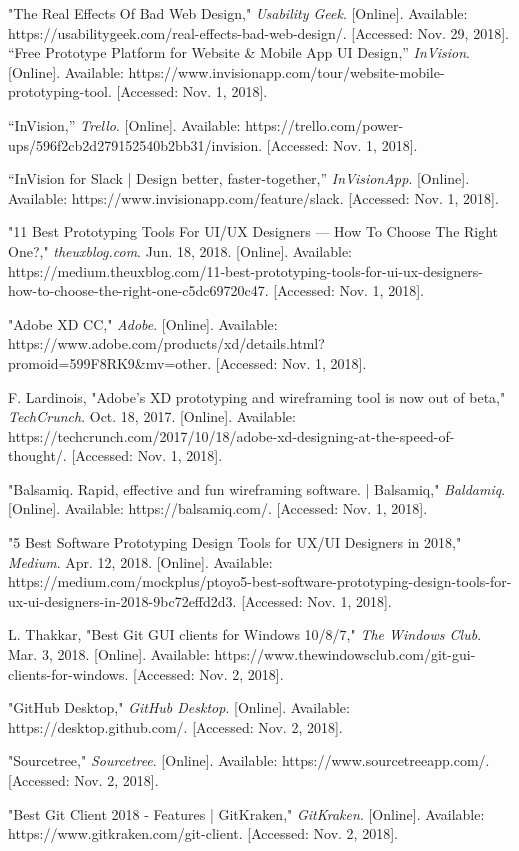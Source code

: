 \documentclass[10pt, letterpaper,draftclsnofoot,onecolumn, compsoc]{IEEEtran}
\begin{document}
\begin{thebibliography}{19}
"The Real Effects Of Bad Web Design,"
\textit{Usability Geek}.
[Online]. Available: https://usabilitygeek.com/real-effects-bad-web-design/. [Accessed: Nov. 29, 2018].
“Free Prototype Platform for Website \& Mobile App UI Design,” 
\textit{InVision}. 
[Online]. Available: https://www.invisionapp.com/tour/website-mobile-prototyping-tool. [Accessed: Nov. 1, 2018].

“InVision,” 
\textit{Trello}. 
[Online]. Available: https://trello.com/power-ups/596f2cb2d279152540b2bb31/invision. [Accessed: Nov. 1, 2018].

“InVision for Slack | Design better, faster-together,” 
\textit{InVisionApp}. 
[Online]. Available: https://www.invisionapp.com/feature/slack. [Accessed: Nov. 1, 2018].

"11 Best Prototyping Tools For UI/UX Designers — How To Choose The Right One?," 
\textit{theuxblog.com}.
Jun. 18, 2018. [Online]. Available: https://medium.theuxblog.com/11-best-prototyping-tools-for-ui-ux-designers-how-to-choose-the-right-one-c5dc69720c47. [Accessed: Nov. 1, 2018].

"Adobe XD CC,"
\textit{Adobe}.
[Online]. Available: https://www.adobe.com/products/xd/details.html?promoid=599F8RK9\&mv=other. [Accessed: Nov. 1, 2018].

F. Lardinois, "Adobe's XD prototyping and wireframing tool is now out of beta," 
\textit{TechCrunch}.
Oct. 18, 2017. [Online]. Available: https://techcrunch.com/2017/10/18/adobe-xd-designing-at-the-speed-of-thought/. [Accessed: Nov. 1, 2018].

"Balsamiq. Rapid, effective and fun wireframing software. | Balsamiq,"
\textit{Baldamiq}.
[Online]. Available: https://balsamiq.com/. [Accessed: Nov. 1, 2018].

"5 Best Software Prototyping Design Tools for UX/UI Designers in 2018,"
\textit{Medium}.
Apr. 12, 2018. [Online]. Available: https://medium.com/mockplus/ptoyo5-best-software-prototyping-design-tools-for-ux-ui-designers-in-2018-9bc72effd2d3. [Accessed: Nov. 1, 2018].

L. Thakkar, "Best Git GUI clients for Windows 10/8/7,"
\textit{The Windows Club}.
Mar. 3, 2018. [Online]. Available: https://www.thewindowsclub.com/git-gui-clients-for-windows. [Accessed: Nov. 2, 2018].

"GitHub Desktop,"
\textit{GitHub Desktop}.
[Online]. Available: https://desktop.github.com/. [Accessed: Nov. 2, 2018].

"Sourcetree,"
\textit{Sourcetree}.
[Online]. Available: https://www.sourcetreeapp.com/. [Accessed: Nov. 2, 2018].

"Best Git Client 2018 - Features | GitKraken,"
\textit{GitKraken}.
[Online]. Available: https://www.gitkraken.com/git-client. [Accessed: Nov. 2, 2018].

\end{thebibliography}
\end{document}
